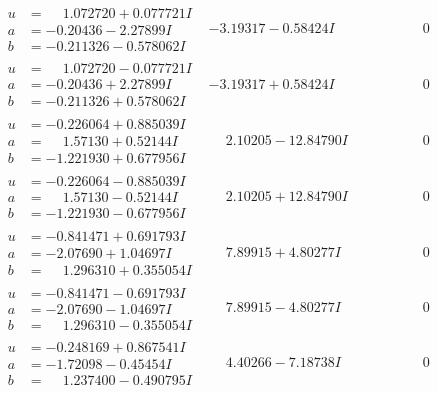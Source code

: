 \documentclass[1p]{elsarticle_modified}
\theoremstyle{definition}
\begin{document}
$$\begin{array}{c|c|c}
\begin{aligned}
u &= \phantom{-}1.072720 + 0.077721 I \\
a &= -0.20436 - 2.27899 I \\
b &= -0.211326 - 0.578062 I\end{aligned}
 & -3.19317 - 0.58424 I & \phantom{-0.000000 } 0 \\ \hline\begin{aligned}
u &= \phantom{-}1.072720 - 0.077721 I \\
a &= -0.20436 + 2.27899 I \\
b &= -0.211326 + 0.578062 I\end{aligned}
 & -3.19317 + 0.58424 I & \phantom{-0.000000 } 0 \\ \hline\begin{aligned}
u &= -0.226064 + 0.885039 I \\
a &= \phantom{-}1.57130 + 0.52144 I \\
b &= -1.221930 + 0.677956 I\end{aligned}
 & \phantom{-}2.10205 - 12.84790 I & \phantom{-0.000000 } 0 \\ \hline\begin{aligned}
u &= -0.226064 - 0.885039 I \\
a &= \phantom{-}1.57130 - 0.52144 I \\
b &= -1.221930 - 0.677956 I\end{aligned}
 & \phantom{-}2.10205 + 12.84790 I & \phantom{-0.000000 } 0 \\ \hline\begin{aligned}
u &= -0.841471 + 0.691793 I \\
a &= -2.07690 + 1.04697 I \\
b &= \phantom{-}1.296310 + 0.355054 I\end{aligned}
 & \phantom{-}7.89915 + 4.80277 I & \phantom{-0.000000 } 0 \\ \hline\begin{aligned}
u &= -0.841471 - 0.691793 I \\
a &= -2.07690 - 1.04697 I \\
b &= \phantom{-}1.296310 - 0.355054 I\end{aligned}
 & \phantom{-}7.89915 - 4.80277 I & \phantom{-0.000000 } 0 \\ \hline\begin{aligned}
u &= -0.248169 + 0.867541 I \\
a &= -1.72098 - 0.45454 I \\
b &= \phantom{-}1.237400 - 0.490795 I\end{aligned}
 & \phantom{-}4.40266 - 7.18738 I & \phantom{-0.000000 } 0 \\ \hline\begin{aligned}

\end{aligned}
\end{array}$$
\end{document}
